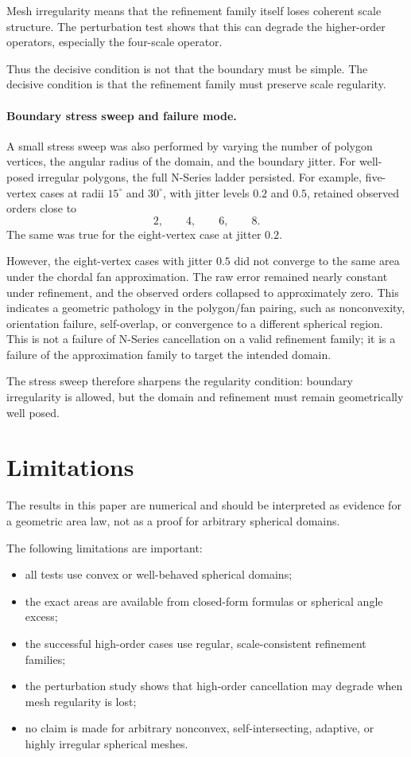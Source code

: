 \documentclass[11pt]{article}
\begin{document}
Mesh irregularity means that the refinement family itself loses coherent
scale structure.  The perturbation test shows that this can degrade the
higher-order operators, especially the four-scale operator.

Thus the decisive condition is not that the boundary must be simple.  The
decisive condition is that the refinement family must preserve scale
regularity.

\paragraph{Boundary stress sweep and failure mode.}
A small stress sweep was also performed by varying the number of polygon
vertices, the angular radius of the domain, and the boundary jitter.  For
well-posed irregular polygons, the full N-Series ladder persisted.  For
example, five-vertex cases at radii $15^\circ$ and $30^\circ$, with jitter
levels $0.2$ and $0.5$, retained observed orders close to
\[
  2,\qquad 4,\qquad 6,\qquad 8.
\]
The same was true for the eight-vertex case at jitter $0.2$.

However, the eight-vertex cases with jitter $0.5$ did not converge to the
same area under the chordal fan approximation.  The raw error remained nearly
constant under refinement, and the observed orders collapsed to approximately
zero.  This indicates a geometric pathology in the polygon/fan pairing, such
as nonconvexity, orientation failure, self-overlap, or convergence to a
different spherical region.  This is not a failure of N-Series cancellation
on a valid refinement family; it is a failure of the approximation family to
target the intended domain.

The stress sweep therefore sharpens the regularity condition: boundary
irregularity is allowed, but the domain and refinement must remain
geometrically well posed.

\section{Limitations}

The results in this paper are numerical and should be interpreted as
evidence for a geometric area law, not as a proof for arbitrary spherical
domains.

The following limitations are important:

\begin{itemize}
\item all tests use convex or well-behaved spherical domains;
\item the exact areas are available from closed-form formulas or spherical
      angle excess;
\item the successful high-order cases use regular, scale-consistent
      refinement families;
\item the perturbation study shows that high-order cancellation may degrade
      when mesh regularity is lost;
\item no claim is made for arbitrary nonconvex, self-intersecting, adaptive,
      or highly irregular spherical meshes.
\end{itemize}
\end{document}
